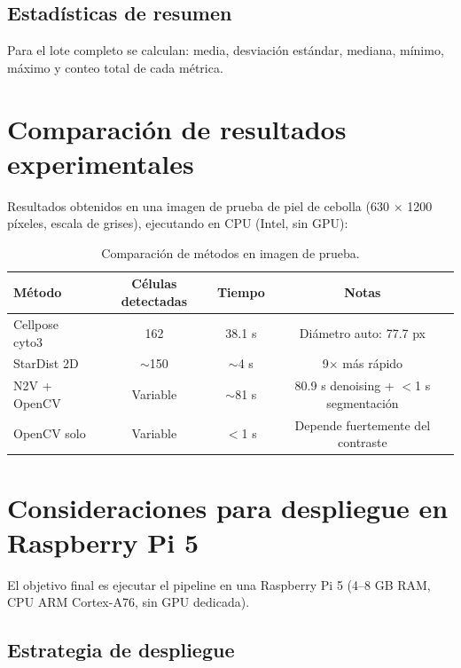 \documentclass[11pt,a4paper]{article}
\begin{document}
\subsection{Estad\'{i}sticas de resumen}

Para el lote completo se calculan: media, desviaci\'{o}n est\'{a}ndar, mediana, m\'{i}nimo, m\'{a}ximo y conteo total de cada m\'{e}trica.

\section{Comparaci\'{o}n de resultados experimentales}

Resultados obtenidos en una imagen de prueba de piel de cebolla (630 $\times$ 1200 p\'{i}xeles, escala de grises), ejecutando en CPU (Intel, sin GPU):

\begin{table}[H]
\centering
\begin{tabular}{lccc}
\toprule
\textbf{M\'{e}todo} & \textbf{C\'{e}lulas detectadas} & \textbf{Tiempo} & \textbf{Notas} \\
\midrule
Cellpose cyto3 & 162 & 38.1 s & Di\'{a}metro auto: 77.7 px \\
StarDist 2D & $\sim$150 & $\sim$4 s & 9$\times$ m\'{a}s r\'{a}pido \\
N2V + OpenCV & Variable & $\sim$81 s & 80.9 s denoising + $<$1 s segmentaci\'{o}n \\
OpenCV solo & Variable & $<$1 s & Depende fuertemente del contraste \\
\bottomrule
\end{tabular}
\caption{Comparaci\'{o}n de m\'{e}todos en imagen de prueba.}
\end{table}

\section{Consideraciones para despliegue en Raspberry Pi 5}

El objetivo final es ejecutar el pipeline en una Raspberry Pi 5 (4--8 GB RAM, CPU ARM Cortex-A76, sin GPU dedicada).

\subsection{Estrategia de despliegue}
\end{document}
